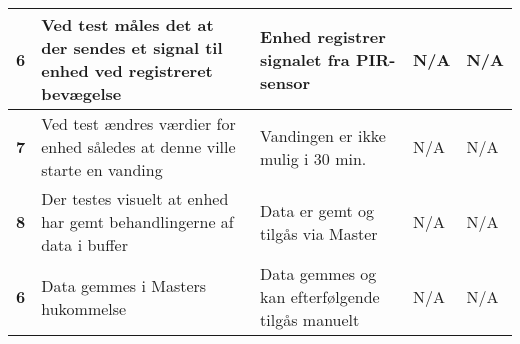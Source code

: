 \begin{center}
\begin{longtable}{|p{}|p{}|p{}|p{}|p{}|}
\textbf{6}	&Ved test måles det at der sendes et signal til enhed ved registreret bevægelse
			&Enhed registrer signalet fra PIR-sensor 
			&N/A
			&N/A \\ \hline 
			
\textbf{7}	&Ved test ændres værdier for enhed således at denne ville starte en vanding
			&Vandingen er ikke mulig i 30 min.
			&N/A
			&N/A \\ \hline 
			
\textbf{8}	&Der testes visuelt at enhed har gemt behandlingerne af data i buffer
			&Data er gemt og tilgås via Master
			&N/A
			&N/A \\ \hline 
			
\textbf{6}	&Data gemmes i Masters hukommelse
			&Data gemmes og kan efterfølgende tilgås manuelt
			&N/A
			&N/A \\ \hline 		
			
			
			
\end{longtable}
	\label{ATUC4} 
\end{center}
